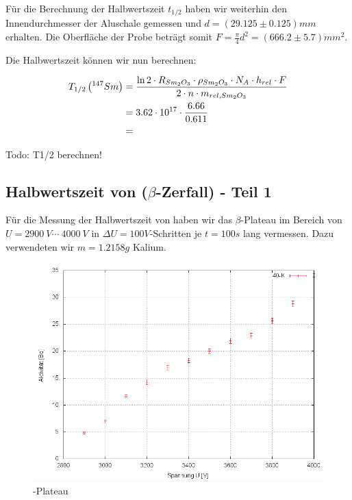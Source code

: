 Für die Berechnung der Halbwertszeit $t_{1/2}$ haben wir weiterhin den Innendurchmesser der Aluschale gemessen und $d = (29.125 \pm 0.125) mm$ erhalten. Die Oberfläche der Probe beträgt somit $F = \frac{\pi}{4} d^2 = (666.2 \pm 5.7) mm^2$.

Die Halbwertszeit können wir nun berechnen:

\begin{align}
 T_{1/2} \left( ^{147}_{}{Sm} \right) &= \frac{\ln 2 \cdot R_{Sm_2O_3} \cdot \rho_{Sm_2O_3} \cdot N_A \cdot h_{rel} \cdot F}{2 \cdot n \cdot m_{rel,Sm_2O_3}} \\
 & = 3.62\cdot 10^{17} \cdot \frac{6.66}{0.611} \\
 & = 
\end{align}



Todo: T1/2 berechnen!

\subsection{Halbwertszeit von  ($\beta$-Zerfall) - Teil 1}

Für die Messung der Halbwertszeit von  haben wir das $\beta$-Plateau im Bereich von $U = 2900\ V \cdots\ 4000\ V$ in $\Delta U = 100 V$-Schritten je $t=100s$ lang vermessen. Dazu verwendeten wir $m=1.2158g$ Kalium.

\begin{figure}[H]
 \centering \includegraphics[width = 0.99\linewidth]{Messwerte/plots/K40_plateau.png}
 \caption{-Plateau}
 \label{k40plateau}
\end{figure}

